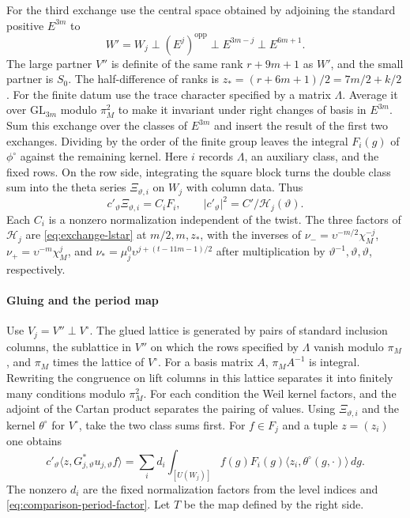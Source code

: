 For the third exchange use the central space obtained by adjoining
the standard positive \(E^{3m}\) to
\[
 W'=W_j\perp(E^j)^{\mathrm{opp}}\perp E^{3m-j}\perp E^{6m+1}.
\]
The large partner \(V''\) is definite of the same rank \(r+9m+1\)
as \(W'\), and the small partner is \(S_0\). The half-difference of
ranks is \(z_*=(r+6m+1)/2=7m/2+k/2\).
For the finite datum use the trace character specified by a matrix
\(\Lambda\). Average it over \(\mathrm{GL}_{3m}\) modulo \(\pi_M^2\)
to make it invariant under right changes of basis in \(E^{3m}\).
Sum this exchange over the classes of \(E^{3m}\) and insert the result
of the first two exchanges. Dividing by the order of the finite group
leaves the integral \(F_i(g)\) of \(\phi^\circ\) against the remaining
kernel. Here \(i\) records \(\Lambda\), an auxiliary class, and the fixed
rows. On the row side, integrating the square block turns the double
class sum into the theta series \(\Xi_{\vartheta,i}\) on \(W_j\)
with column data. Thus
\begin{equation}\label{eq:comparison-period-factor}
 c'_\vartheta\Xi_{\vartheta,i}=C_i F_i,\qquad
 |c'_\vartheta|^2=C'/\mathcal H_j(\vartheta).
\end{equation}
Each \(C_i\) is a nonzero normalization independent of the twist.
The three factors of \(\mathcal H_j\) are \eqref{eq:exchange-lstar} at
\(m/2,m,z_*\), with the inverses of
\(\nu_-=\upsilon^{-m/2}\chi_M^{-j}\),
\(\nu_+=\upsilon^{-m}\chi_M^j\), and
\(\nu_*=\mu_j^0\upsilon^{j+(t-11m-1)/2}\) after multiplication by
\(\vartheta^{-1},\vartheta,\vartheta\), respectively.

\paragraph{Gluing and the period map}
Use \(V_j=V''\perp V^\circ\). The glued lattice is generated by pairs of
standard inclusion columns, the sublattice in \(V''\) on which the rows
specified by \(\Lambda\) vanish modulo \(\pi_M\), and \(\pi_M\) times the
lattice of \(V^\circ\). For a basis matrix \(A\), \(\pi_M A^{-1}\) is
integral. Rewriting the congruence on lift columns in this lattice
separates it into finitely many conditions modulo \(\pi_M^2\).
For each condition the Weil kernel factors, and the adjoint of the
Cartan product separates the pairing of values. Using
\(\Xi_{\vartheta,i}\) and the kernel \(\theta^\circ\) for \(V^\circ\),
take the two class sums first. For \(f\in F_j\) and a tuple \(z=(z_i)\)
one obtains
\[
 c'_\vartheta\langle z,G_{j,\vartheta}^*u_{j,\vartheta} f\rangle
    =\sum_i d_i\int_{[U(W_j)]}
      f(g)F_i(g)\langle z_i,\theta^\circ(g,\cdot)\rangle\,dg .
\]
The nonzero \(d_i\) are the fixed normalization factors from the
level indices and \eqref{eq:comparison-period-factor}. Let \(T\) be the
map defined by the right side.

